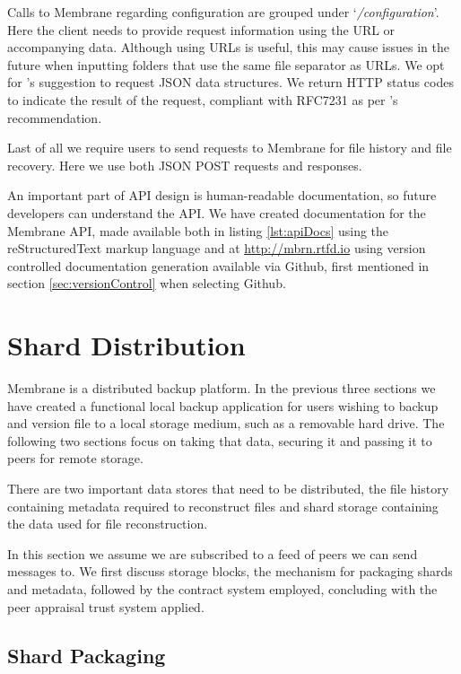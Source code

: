 \documentclass[11pt, a4paper, twoside]{report}
\begin{document}
Calls to Membrane regarding configuration are grouped under `\emph{/configuration}'. Here the client needs to provide request information using the URL or accompanying data. Although using URLs is useful, this may cause issues in the future when inputting folders that use the same file separator as URLs. We opt for \cite{heroku2017api}'s suggestion to request JSON data structures. We return HTTP status codes to indicate the result of the request, compliant with RFC7231 \citep{fielding2014hypertext} as per \cite{google2017api}'s recommendation.

Last of all we require users to send requests to Membrane for file history and file recovery. Here we use both JSON POST requests and responses.

An important part of API design is human-readable documentation, so future developers can understand the API. \citep{heroku2017api} We have created documentation for the Membrane API, made available both in listing \ref{lst:apiDocs} using the reStructuredText markup language and at \url{http://mbrn.rtfd.io} using version controlled documentation generation available via Github, first mentioned in section \ref{sec:versionControl} when selecting Github.

\section{Shard Distribution}

Membrane is a distributed backup platform. In the previous three sections we have created a functional local backup application for users wishing to backup and version file to a local storage medium, such as a removable hard drive. The following two sections focus on taking that data, securing it and passing it to peers for remote storage.

There are two important data stores that need to be distributed, the file history containing metadata required to reconstruct files and shard storage containing the data used for file reconstruction.

In this section we assume we are subscribed to a feed of peers we can send messages to. We first discuss storage blocks, the mechanism for packaging shards and metadata, followed by the contract system employed, concluding with the peer appraisal trust system applied.

\subsection{Shard Packaging}
\end{document}
